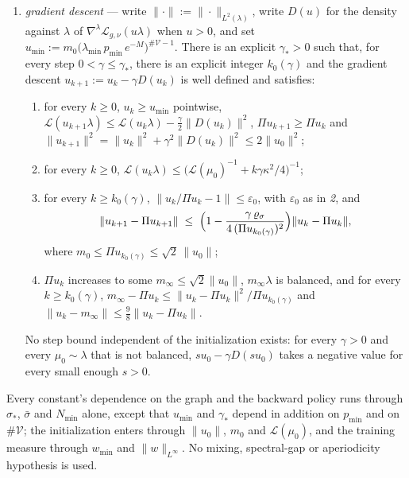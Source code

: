\begin{theorem}
\begin{enumerate}
    \begin{equation}
        \varrho_\sigma\;=\;\frac{g''(1)\,w_{\min}\,\lambda_{\min}}{\sigma_*^{\,2}}\;=\;\frac{2\,w_{\min}\,N_{\min}}{\sigma_*^{\,2}\,(2+\bar\sigma)} ;
    \end{equation}
    \item \emph{gradient descent} --- write $\|\cdot\|:=\|\cdot\|_{L^2(\lambda)}$, write $D(u)$ for the density against $\lambda$ of $\nabla^\lambda\mathcal L_{g,\nu}(u\lambda)$ when $u>0$, and set $u_{\min}:=m_0\bigl(\lambda_{\min}\,p_{\min}\,e^{-M}\bigr)^{\#\mathcal V-1}$. There is an explicit $\gamma_*>0$ such that, for every step $0<\gamma\leq\gamma_*$, there is an explicit integer $k_0(\gamma)$ and the gradient descent $u_{k+1}:=u_k-\gamma D(u_k)$ is well defined and satisfies:
    \begin{enumerate}
        \item for every $k\geq0$, $u_k\geq u_{\min}$ pointwise, $\mathcal L(u_{k+1}\lambda)\leq\mathcal L(u_k\lambda)-\frac\gamma2\|D(u_k)\|^2$, $\Pi u_{k+1}\geq\Pi u_k$ and $\|u_{k+1}\|^2=\|u_k\|^2+\gamma^2\|D(u_k)\|^2\leq2\|u_0\|^2$;
        \item for every $k\geq0$, $\mathcal L(u_k\lambda)\leq\bigl(\mathcal L(\mu_0)^{-1}+k\gamma\kappa^2/4\bigr)^{-1}$;
        \item for every $k\geq k_0(\gamma)$, $\|u_k/\Pi u_k-1\|\leq\varepsilon_0$, with $\varepsilon_0$ as in \emph{2}, and
        \begin{equation*}
            \|u_{k+1}-\Pi u_{k+1}\|\;\leq\;\Bigl(1-\frac{\gamma\,\varrho_\sigma}{4\,(\Pi u_{k_0(\gamma)})^2}\Bigr)\|u_k-\Pi u_k\|,
        \end{equation*}
        where $m_0\leq\Pi u_{k_0(\gamma)}\leq\sqrt2\,\|u_0\|$;
        \item $\Pi u_k$ increases to some $m_\infty\leq\sqrt2\|u_0\|$, $m_\infty\lambda$ is balanced, and for every $k\geq k_0(\gamma)$, $m_\infty-\Pi u_k\leq\|u_k-\Pi u_k\|^2/\Pi u_{k_0(\gamma)}$ and $\|u_k-m_\infty\|\leq\frac98\|u_k-\Pi u_k\|$.
    \end{enumerate}
    No step bound independent of the initialization exists: for every $\gamma>0$ and every $\mu_0\sim\lambda$ that is not balanced, $su_0-\gamma D(su_0)$ takes a negative value for every small enough $s>0$.
\end{enumerate}
Every constant's dependence on the graph and the backward policy runs through $\sigma_*$, $\bar\sigma$ and $N_{\min}$ alone, except that $u_{\min}$ and $\gamma_*$ depend in addition on $p_{\min}$ and on $\#\mathcal V$; the initialization enters through $\|u_0\|$, $m_0$ and $\mathcal L(\mu_0)$, and the training measure through $w_{\min}$ and $\|w\|_{L^\infty}$. No mixing, spectral-gap or aperiodicity hypothesis is used.
\end{theorem}

